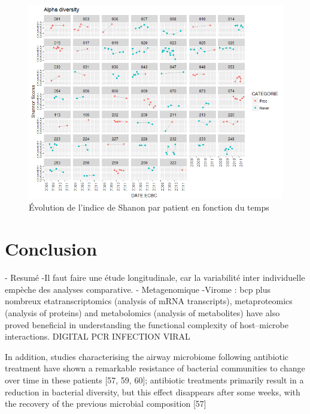 \documentclass[12pt,a4paper]{article}
\begin{document}
\begin{figure}
\begin{center}
\includegraphics[scale=0.80]{img/alpha_shannon.png}\hfill
\end{center}
\caption{Évolution de l'indice de Shanon par patient en fonction du temps}
\label{alphaShannon}
\end{figure}


\section{Conclusion}
- Resumé 
-Il faut faire une étude longitudinale, car la variabilité inter individuelle empèche des analyses comparative. 
- Metagenomique 
-Virome  : bcp plus nombreux 
etatranscriptomics (analysis of mRNA transcripts), metaproteomics (analysis of proteins) and metabolomics (analysis of metabolites) have also proved beneficial in understanding the functional complexity of host–microbe interactions.
DIGITAL PCR
INFECTION VIRAL

In addition, studies characterising the airway microbiome following antibiotic treatment have shown a
remarkable resistance of bacterial communities to change over time in these patients [57, 59, 60];
antibiotic treatments primarily result in a reduction in bacterial diversity, but this effect disappears after
some weeks, with the recovery of the previous microbial composition [57]

\newpage




\end{document}
